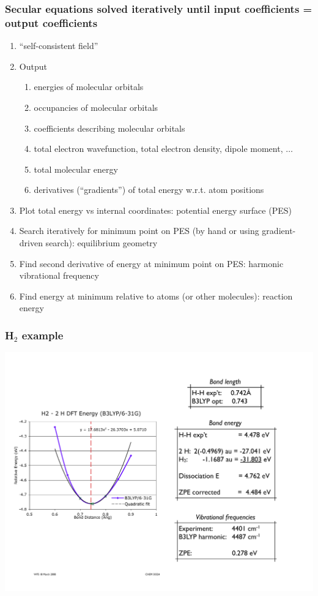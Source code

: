 \documentclass[11pt]{article}
\begin{document}
\subsubsection{Secular equations solved iteratively until input coefficients = output coefficients}
\label{sec:org314f0dd}
\begin{enumerate}
\item ``self-consistent field''
\item Output
\begin{enumerate}
\item energies of molecular orbitals
\item occupancies of molecular orbitals
\item coefficients describing molecular orbitals
\item total electron wavefunction, total electron density, dipole moment, \(\ldots\)
\item total molecular energy
\item derivatives (``gradients'') of total energy w.r.t. atom positions
\end{enumerate}
\item Plot total energy vs internal coordinates: potential energy surface (PES)
\item Search iteratively for minimum point on PES (by hand or using gradient-driven search): equilibrium geometry
\item Find second derivative of energy at minimum point on PES: harmonic vibrational frequency
\item Find energy at minimum relative to atoms (or other molecules): reaction energy
\end{enumerate}
\subsubsection{H\(_2\) example}
\label{sec:orgb6a5626}
\begin{center}
  \includegraphics[scale=0.6]{Images/H2-PES}
\end{center}
\end{document}
